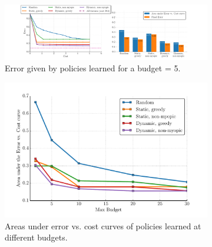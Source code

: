 \begin{figure}[ht]
\centering
    \centering
    \begin{subfigure}[b]{0.39\textwidth}
            \includegraphics[width=\textwidth]{../../figures/apr11_assembly/scene_15_5_crop.pdf}
            \caption{Error given by policies learned for a budget = 5.}
    \end{subfigure}%
    \begin{subfigure}[b]{0.36\textwidth}
            \includegraphics[width=\textwidth]{../../figures/apr11_assembly/_scenes15_auc.pdf}
            \caption{Areas under error vs. cost curves of policies learned at different budgets.}
    \end{subfigure}%
    \begin{subfigure}[b]{0.25\textwidth}

\end{subfigure}
\end{figure}

